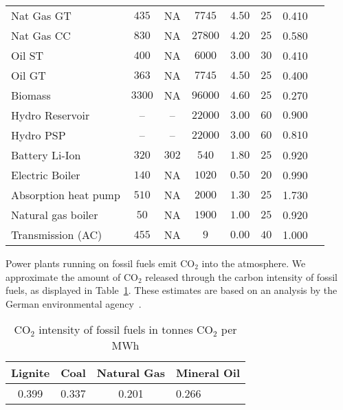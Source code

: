 \documentclass[review, 3p, times, 12pt]{elsarticle} %
\newcommand{\COO}{\ensuremath{\mathrm{CO_2}} }
\begin{document}
\begin{ThreePartTable}
\begin{longtable}{l ccc ccc l}
Nat Gas GT           & $435$  & NA    & $7745$  & $4.50$ & $25$ & 0.410 & \cite{DEA2019}\\
Nat Gas CC           & $830$  & NA    & $27800$ & $4.20$ & $25$ & 0.580 & \cite{DEA2019}\\
Oil ST               & $400$  & NA    & $6000$  & $3.00$ & $30$ & 0.410 & \cite{Schroeder2013}\\
Oil GT               & $363$  & NA    & $7745$  & $4.50$ & $25$ & 0.400 & \cite{DEA2019}\\
Biomass              & $3300$ & NA    & $96000$ & $4.60$ & $25$ & 0.270 & \cite{DEA2019}\\ \midrule
Hydro Reservoir      & --     & --    & $22000$ & $3.00$ & $60$ & $0.900$\tnote{$\dagger$} & \cite{LacalArantegui2014}\\
Hydro PSP            & --     & --    & $22000$ & $3.00$ & $60$ & $0.810$\tnote{$\dagger$} & \cite{LacalArantegui2014}\\
Battery Li-Ion       & $320$ & $302$ & $540$ & $1.80$ & $25$ & 0.920 & \cite{DEA2020}\\ \midrule
Electric Boiler      & $140$  & NA    & $1020$  & $0.50$ & $20$ & 0.990 & \cite{DEA2019}\\
Absorption heat pump & $510$  & NA    & $2000$  & $1.30$ & $25$ & 1.730 & \cite{DEA2019}\\
Natural gas boiler   & $50$   & NA    & $1900$  & $1.00$ & $25$ & 0.920\tnote{$\dagger$} & \cite{DEA2019} \\ \midrule
Transmission (AC)    & $455$\tnote{$\ddagger$} & NA    & $9$\tnote{$\ddagger$} & $0.00$ & $40$ & 1.000 & \cite{Brown2018, Hagspiel2014}\\
\end{longtable}
\end{ThreePartTable}

Power plants running on fossil fuels emit \COO into the atmosphere.
We approximate the amount of \COO released through the carbon intensity of fossil fuels, as displayed in Table~\ref{table:carbon-intensity}. These estimates are based on an analysis by the German environmental agency~\citep{Juhrich2016}.

\begin{table}[h!t]
\centering
\caption{\COO intensity of fossil fuels in tonnes \COO per MWh}
\label{table:carbon-intensity}
\begin{tabular}{c c c l}
\toprule
Lignite & Coal & Natural Gas & Mineral Oil  \\
\midrule
0.399 & 0.337 & 0.201 & 0.266        \\
\bottomrule
\end{tabular}
\end{table}
\end{document}
